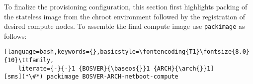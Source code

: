 
To finalize the \xCAT{} provisioning configuration, this section first highlights
packing of the stateless image from the chroot environment followed by the
registration of desired compute nodes. To assemble the final compute image use
\texttt{packimage} as follows:

\begin{lstlisting}[language=bash,keywords={},basicstyle=\fontencoding{T1}\fontsize{8.0}{10}\ttfamily,
    literate={-}{-}1 {BOSVER}{\baseos{}}1 {ARCH}{\arch{}}1]
[sms](*\#*) packimage BOSVER-ARCH-netboot-compute
\end{lstlisting}
